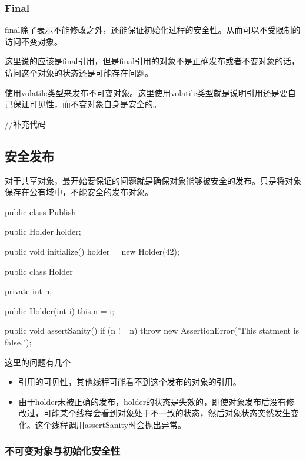 \subsubsection{Final}

final除了表示不能修改之外，还能保证初始化过程的安全性。从而可以不受限制的访问不变对象。

这里说的应该是final引用，但是final引用的对象不是正确发布或者不变对象的话，访问这个对象的状态还是可能存在问题。


使用volatile类型来发布不可变对象。这里使用volatile类型就是说明引用还是要自己保证可见性，而不变对象自身是安全的。

\begin{Java}
//补充代码
\end{Java}

\subsection{安全发布}

对于共享对象，最开始要保证的问题就是确保对象能够被安全的发布。只是将对象保存在公有域中，不能安全的发布对象。

\begin{Java}
public class Publish {

	public Holder holder;
	
	public void initialize() {
		holder = new Holder(42);
	}
}

public class Holder {
	
	private int n;

	public Holder(int i) {
		this.n = i;
	}

	public void assertSanity() {
		if (n != n) {
			throw new AssertionError("This statment is false.");
		}
	}
}
\end{Java}

这里的问题有几个
\begin{itemize}
\item 引用的可见性，其他线程可能看不到这个发布的对象的引用。
\item 由于holder未被正确的发布，holder的状态是失效的，即使对象发布后没有修改过，可能某个线程会看到对象处于不一致的状态，然后对象状态突然发生变化。这个线程调用assertSanity时会抛出异常。
\end{itemize}

\subsubsection{不可变对象与初始化安全性}

